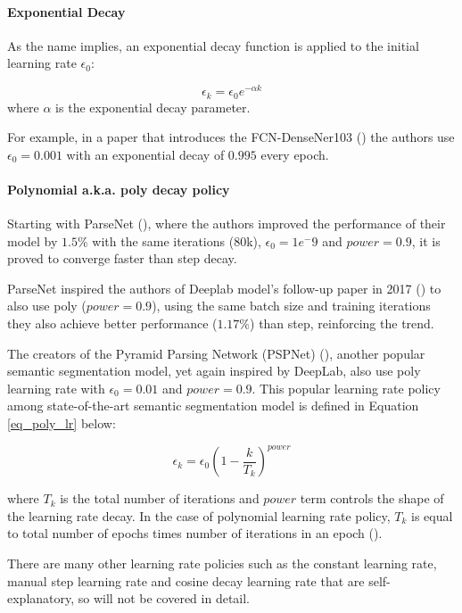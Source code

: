 \paragraph{Exponential Decay} 
As the name implies, an exponential decay function is applied to the initial learning rate $\epsilon_0$:

\begin{equation} \label{eq_exp_lr}
\epsilon_k = \epsilon_0e^{-\alpha k}
\end{equation} 
where $\alpha$ is the exponential decay parameter.

For example, in a paper that introduces the \gls{FCN}-DenseNer103 (\cite{Jegou_2017_CVPR_Workshops}) the authors use $\epsilon_0=0.001$ with an exponential decay of $0.995$ every epoch.
\paragraph{Polynomial \gls{a.k.a.} poly decay policy} 

Starting with ParseNet (\cite{liu2015parsenet}), where the authors improved the performance of their model by $1.5\%$ with the same iterations (80k), $\epsilon_0= 1e^-9 $ and $power=0.9$, it is proved to converge faster than step decay. 

ParseNet inspired the authors of Deeplab model's follow-up paper in 2017 (\cite{chen2017deeplab}) to also use poly ($power=0.9$), using the same batch size and training iterations they also achieve better performance ($1.17\%$) than step, reinforcing the trend. 

The creators of the Pyramid Parsing Network (PSPNet) (\cite{zhao2017pyramid}), another popular semantic segmentation model, yet again inspired by DeepLab, also use poly learning rate with $\epsilon_0= 0.01$ and $power=0.9$. This popular learning rate policy among state-of-the-art semantic segmentation model is defined in Equation \ref{eq_poly_lr} below:

\begin{equation} \label{eq_poly_lr}
\epsilon_k=\epsilon_0(1- \frac{k}{T_{k}})^{power} 
\end{equation}

where $T_{k}$ is the total number of iterations and $power$ term controls the shape of the learning rate decay. In the case of polynomial learning rate policy, $T_{k}$ is equal to total number of epochs times number of iterations in an epoch (\cite{8929465}).

There are many other learning rate policies such as the constant learning rate, manual step learning rate and cosine decay learning rate that are self-explanatory, so will not be covered in detail.

